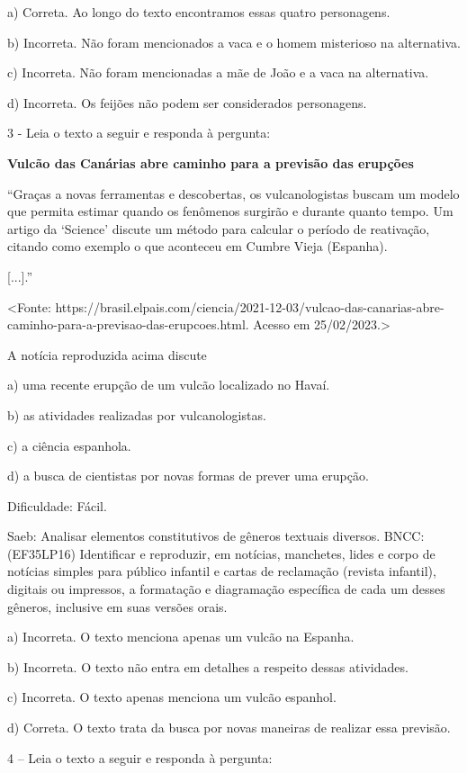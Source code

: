 a) Correta. Ao longo do texto encontramos essas quatro personagens.

b) Incorreta. Não foram mencionados a vaca e o homem misterioso na
alternativa.

c) Incorreta. Não foram mencionadas a mãe de João e a vaca na
alternativa.

d) Incorreta. Os feijões não podem ser considerados personagens.

3 - Leia o texto a seguir e responda à pergunta:

\textbf{Vulcão das Canárias abre caminho para a previsão das erupções}

``Graças a novas ferramentas e descobertas, os vulcanologistas buscam um
modelo que permita estimar quando os fenômenos surgirão e durante quanto
tempo. Um artigo da `Science' discute um método para calcular o período
de reativação, citando como exemplo o que aconteceu em Cumbre Vieja
(Espanha).

{[}...{]}.''

\textless{}Fonte:
https://brasil.elpais.com/ciencia/2021-12-03/vulcao-das-canarias-abre-caminho-para-a-previsao-das-erupcoes.html.
Acesso em 25/02/2023.\textgreater{}

A notícia reproduzida acima discute

a) uma recente erupção de um vulcão localizado no Havaí.

b) as atividades realizadas por vulcanologistas.

c) a ciência espanhola.

d) a busca de cientistas por novas formas de prever uma erupção.

Dificuldade: Fácil.

Saeb: Analisar elementos constitutivos de gêneros textuais diversos.
BNCC: (EF35LP16) Identificar e reproduzir, em notícias, manchetes, lides
e corpo de notícias simples para público infantil e cartas de reclamação
(revista infantil), digitais ou impressos, a formatação e diagramação
específica de cada um desses gêneros, inclusive em suas versões orais.

a) Incorreta. O texto menciona apenas um vulcão na Espanha.

b) Incorreta. O texto não entra em detalhes a respeito dessas
atividades.

c) Incorreta. O texto apenas menciona um vulcão espanhol.

d) Correta. O texto trata da busca por novas maneiras de realizar essa
previsão.

4 -- Leia o texto a seguir e responda à pergunta:

